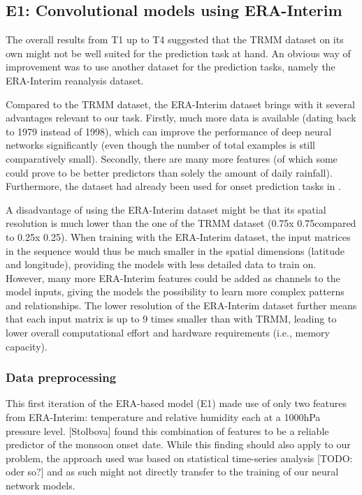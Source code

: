\subsection{E1: Convolutional models using ERA-Interim}
\label{sst:nn_e1}
The overall results from T1 up to T4 suggested that the TRMM dataset on its own might not be well suited for the prediction task at hand. An obvious way of improvement was to use another dataset for the prediction tasks, namely the ERA-Interim reanalysis dataset.

Compared to the TRMM dataset, the ERA-Interim dataset brings with it several advantages relevant to our task. Firstly, much more data is available (dating back to 1979 instead of 1998), which can improve the performance of deep neural networks significantly (even though the number of total examples is still comparatively small). Secondly, there are many more features (of which some could prove to be better predictors than solely the amount of daily rainfall). Furthermore, the dataset had already been used for onset prediction tasks in \citep{Stolbova.2015}.

A disadvantage of using the ERA-Interim dataset might be that its spatial resolution is much lower than the one of the TRMM dataset (0.75\degree x 0.75\degree compared to 0.25\degree x 0.25\degree). When training with the ERA-Interim dataset, the input matrices in the sequence would thus be much smaller in the spatial dimensions (latitude and longitude), providing the models with less detailed data to train on. However, many more ERA-Interim features could be added as channels to the model inputs, giving the models the possibility to learn more complex patterns and relationships. The lower resolution of the ERA-Interim dataset further means that each input matrix is up to 9 times smaller than with TRMM, leading to lower overall computational effort and hardware requirements (i.e., memory capacity).

\subsubsection{Data preprocessing}
\label{ssst:nn_e1_data}
This first iteration of the ERA-based model (E1) made use of only two features from ERA-Interim: temperature and relative humidity each at a 1000hPa pressure level. [Stolbova] found this combination of features to be a reliable predictor of the monsoon onset date. While this finding should also apply to our problem, the approach used was based on statistical time-series analysis [TODO: oder so?] and as such might not directly transfer to the training of our neural network models.

